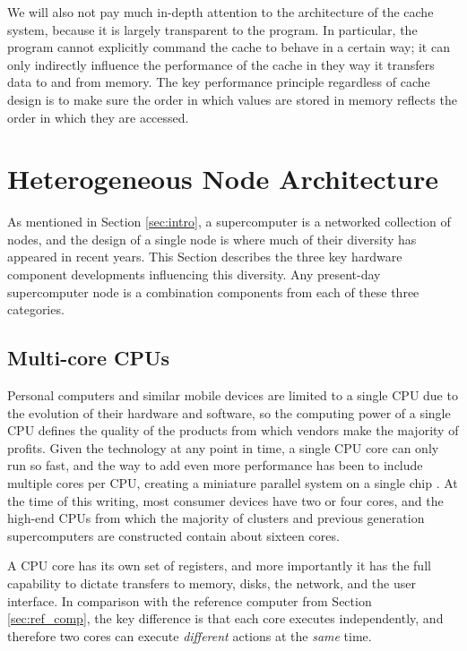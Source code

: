 We will also not pay much in-depth attention to the
architecture of the cache system, because it
is largely transparent to the program.
In particular, the program cannot explicitly
command the cache to behave in a certain way;
it can only indirectly influence the performance
of the cache in they way it transfers data to and
from memory.
The key performance principle regardless of cache design is
to make sure the order in which values are stored
in memory reflects the order in which they are accessed.

\section{Heterogeneous Node Architecture}
\label{sec:node_hw}

As mentioned in Section \ref{sec:intro}, a supercomputer is
a networked collection of nodes, and the design of a single node
is where much of their diversity has appeared in recent years.
This Section describes the three key hardware component developments
influencing this diversity.
Any present-day supercomputer node is a combination components
from each of these three categories.

\subsection{Multi-core CPUs}

Personal computers and similar mobile devices are limited
to a single CPU due to the evolution of their hardware and
software, so the computing power of a single CPU defines
the quality of the products from which vendors make
the majority of profits.
Given the technology at any point in time, a single CPU
core can only run so fast, and the way to add even more performance
has been to include multiple cores per CPU,
creating a miniature parallel system on a single chip
\cite{hennessy2011computer}.
At the time of this writing, most consumer devices
have two or four cores, and the high-end CPUs from
which the majority of clusters and previous generation
supercomputers are constructed
contain about sixteen cores.

A CPU core has its own set of registers, and more importantly
it has the full capability to dictate transfers to memory,
disks, the network, and the user interface.
In comparison with the reference computer from Section \ref{sec:ref_comp},
the key difference is that each core executes independently,
and therefore two cores can execute \emph{different} actions
at the \emph{same} time.

